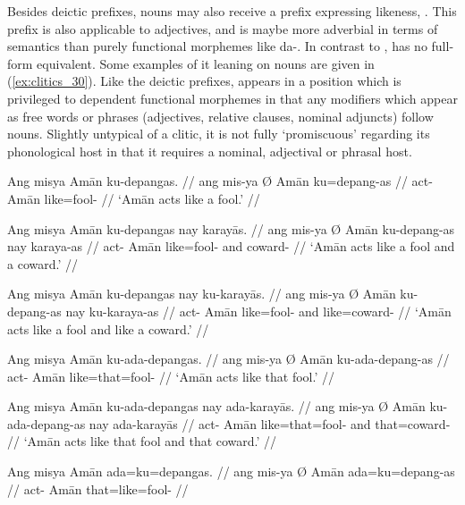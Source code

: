 Besides deictic prefixes, nouns may also receive a prefix expressing likeness,
. This prefix is also applicable to adjectives, and is maybe
more adverbial in terms of semantics than purely functional morphemes like
 {da-}. In contrast to ,  has no full-
form equivalent. Some examples of it leaning on nouns are given in 
(\ref{ex:clitics_30}). Like the deictic prefixes,  appears in a
position which is privileged to dependent functional morphemes in that any
modifiers which appear as free words or phrases (adjectives, relative clauses,
nominal adjuncts) follow nouns. Slightly untypical of a clitic, it is not fully
`promiscuous' regarding its phonological host in that it requires a nominal,
adjectival or phrasal host.

\pex\label{ex:clitics_30}
\a\label{ex:clitics_30a}\begingl
	\gla Ang misya {} Amān ku-depangas. //
	\glb ang mis-ya Ø Amān ku=depang-as //
	\glc \AgtT{} act-\TsgM{} \Top{} Amān like=fool-\Parg{} //
	\glft `Amān acts like a fool.' //
\endgl

\a\label{ex:clitics_30b}\begingl
	\gla Ang misya {} Amān ku-depangas nay karayās. //
	\glb ang mis-ya Ø Amān ku-depang-as nay karaya-as //
	\glc \AgtT{} act-\TsgM{} \Top{} Amān like=fool-\Parg{} and 
		coward-\Parg{} //
	\glft `Amān acts like a fool and a coward.' //
\endgl

\a\label{ex:clitics_30c}\begingl
	\gla Ang misya {} Amān ku-depangas nay ku-karayās. //
	\glb ang mis-ya Ø Amān ku-depang-as nay ku-karaya-as //
	\glc \AgtT{} act-\TsgM{} \Top{} Amān like=fool-\Parg{} and 
		like=coward-\Parg{}	//
	\glft `Amān acts like a fool and like a coward.' //
\endgl

\a\label{ex:clitics_30d}\begingl
	\gla Ang misya {} Amān ku-ada-depangas. //
	\glb ang mis-ya Ø Amān ku-ada-depang-as //
	\glc \AgtT{} act-\TsgM{} \Top{} Amān like=that=fool-\Parg{} //
	\glft `Amān acts like that fool.' //
\endgl

\a\label{ex:clitics_30e}\begingl
	\gla Ang misya {} Amān ku-ada-depangas nay ada-karayās. //
	\glb ang mis-ya Ø Amān ku-ada-depang-as nay ada-karayās //
	\glc \AgtT{} act-\TsgM{} \Top{} Amān like=that=fool-\Parg{} and 
		that=coward-\Parg{} //
	\glft `Amān acts like that fool and that coward.' //
\endgl

\a\label{ex:clitics_30f}\ljudge{*}\begingl
	\gla Ang misya {} Amān ada=ku=depangas. //
	\glb ang mis-ya Ø Amān ada=ku=depang-as //
	\glc \AgtT{} act-\TsgM{} \Top{} Amān that=like=fool-\Parg{} //
\endgl
\xe

